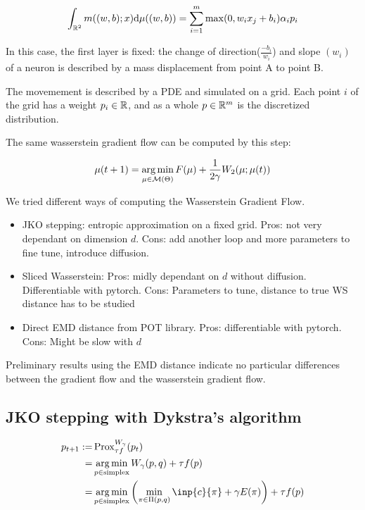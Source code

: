 \begin{equation}
	\int_{\mathbb{R}^2} m((w, b); x) \mathrm{d} \mu((w, b)) = \sum_{i=1}^{m} \max(0, w_i x_j + b_i) \alpha_i p_i
\end{equation}

In this case, the first layer is fixed: the change of direction($\frac{-b_i}{w_i}$) and slope $(w_i)$ of a neuron is described by a mass displacement from point A to point B. 

The movemement is described by a PDE and simulated on a grid. Each point $i$ of the grid has a weight $p_i \in \mathbb{R}$, and as a whole $p \in \mathbb{R}^m$ is the discretized distribution.

The same wasserstein gradient flow can be computed by this step:

\begin{equation}
	\mu(t+1) = \operatorname*{arg\,min}_{\mu \in \mathcal{M}(\Theta)} F(\mu) + \frac{1}{2 \gamma} W_2(\mu; \mu(t))
\end{equation}

We tried different ways of computing the Wasserstein Gradient Flow. 

\begin{itemize}
	\item JKO stepping: entropic approximation on a fixed grid. Pros: not very dependant on dimension $d$. Cons: add another loop and more parameters to fine tune, introduce diffusion.
		\item Sliced Wasserstein: Pros: midly dependant on $d$ without diffusion. Differentiable with pytorch. Cons: Parameters to tune, distance to true WS distance has to be studied
		\item Direct EMD distance from POT library. Pros: differentiable with pytorch. Cons: Might be slow with $d$
\end{itemize}

Preliminary results using the EMD distance indicate no particular differences between the gradient flow and the wasserstein gradient flow.

\subsection{JKO stepping with Dykstra's algorithm}

\begin{align}
p_{t+1} := & \prox^{W_{\gamma}}_{\tau f}(p_t) \\
							= & \argmin_{p \in \text{simplex}} W_{\gamma}(p, q) + \tau f(p) \\
							= &\argmin_{p \in \text{simplex}}  \left( \min_{\pi \in \Pi(p, q)} \inp{c}{\pi} + \gamma E(\pi) \right) + \tau f(p)
\end{align}

